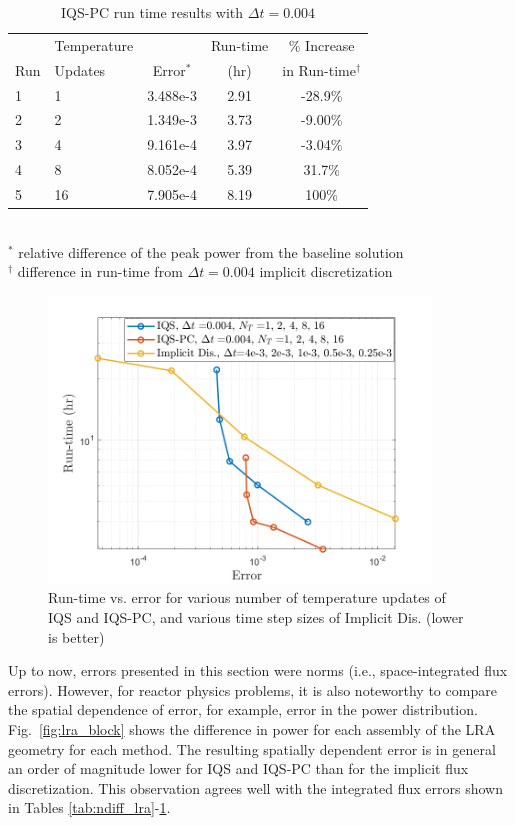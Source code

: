 \documentclass{elsarticle}
\newcommand{\fig}[1]{Fig.~\ref{#1}}                      %
\newcommand{\iqspc}{IQS-PC\xspace}
\begin{document}
\begin{table}[!htbp]
\begin{center}
\caption{\iqspc run time results with $\Delta t = 0.004$}
\label{tab:iqspc_lra}
\begin{tabular}{|l|l|ccc|}
\hline
	&  Temperature 	&  		& Run-time 	& \% Increase	\\
Run	&  Updates 	& Error$^*$ & (hr)		& in Run-time$^{\dagger}$\\
\hline
1	& 1		& 3.488e-3 	& 2.91 	& -28.9\%	\\
2	& 2		& 1.349e-3 	& 3.73	& -9.00\%	\\
\rowcolor{yellow} 3 	& 4 	& 9.161e-4 	& 3.97	& -3.04\%	\\
4 	& 8 	& 8.052e-4 	& 5.39	&  31.7\%	\\
5 	& 16	& 7.905e-4 	& 8.19	&  100\%	\\
\hline
\end{tabular}
\\
\footnotesize{$^*$ relative difference of the peak power from the baseline solution}\\
\footnotesize{$^{\dagger}$ difference in run-time from $\Delta t = 0.004$ implicit discretization} 
\end{center}
\end{table}

\begin{figure}[htbp!]
\centering
\includegraphics[height=3in]{figures/lra_rt_vs_err.png}
\caption{Run-time vs. error for various number of temperature updates of IQS and \iqspc, and various time step sizes of Implicit Dis. (lower is better)}
\label{fig:lra_rt_vs_err}
\end{figure}

Up to now, errors presented in this section were norms (i.e., space-integrated flux errors). However, for reactor physics problems, it is also noteworthy to compare the spatial dependence of error, for example, error in the power distribution. \fig{fig:lra_block} shows the difference in power for each assembly of the LRA geometry for each method. The resulting spatially dependent error is in general an order of magnitude lower for IQS and \iqspc than for the implicit flux discretization. This observation agrees well with the integrated flux errors shown in Tables \ref{tab:ndiff_lra}-\ref{tab:iqspc_lra}. 
\end{document}
